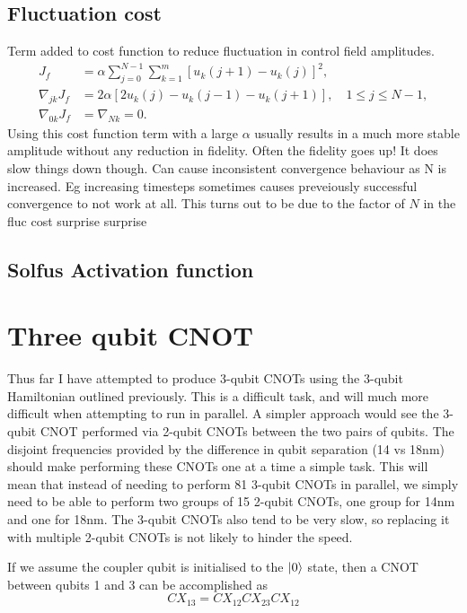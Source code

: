 \documentclass[12pt]{article}
\begin{document}
\subsection{Fluctuation cost}
Term added to cost function to reduce fluctuation in control field amplitudes.
\begin{align}
    J_f &= \alpha\sum_{j=0}^{N-1}\sum_{k=1}^m \left[u_k(j+1)-u_k(j)\right]^2,\\
    \nabla_{jk} J_f&= 2\alpha\left[2u_k(j) - u_k(j-1) - u_k(j+1)\right],\quad 1\leq j\leq N-1,\\
    \nabla_{0k}J_f &= \nabla_{Nk} = 0.
\end{align}
Using this cost function term with a large $\alpha$ usually results in a much more stable amplitude without any reduction in fidelity. Often the fidelity goes up! It does slow things down though. Can cause inconsistent convergence behaviour as N is increased. Eg increasing timesteps sometimes causes preveiously successful convergence to not work at all. This turns out to be due to the factor of $N$ in the fluc cost surprise surprise

\subsection{Solfus Activation function}
    
    
\section{Three qubit CNOT}
Thus far I have attempted to produce 3-qubit CNOTs using the 3-qubit Hamiltonian outlined previously. This is a difficult task, and will much more difficult when attempting to run in parallel. A simpler approach would see the 3-qubit CNOT performed via 2-qubit CNOTs between the two pairs of qubits. The disjoint frequencies provided by the difference in qubit separation (14 vs 18nm) should make performing these CNOTs one at a time a simple task. This will mean that instead of needing to perform 81 3-qubit CNOTs in parallel, we simply need to be able to perform two groups of 15 2-qubit CNOTs, one group for 14nm and one for 18nm. The 3-qubit CNOTs also tend to be very slow, so replacing it with multiple 2-qubit CNOTs is not likely to hinder the speed.

If we assume the coupler qubit is initialised to the $\ket{0}$ state, then a CNOT between qubits 1 and 3 can be accomplished as
\begin{equation}
    CX_{13} = CX_{12}CX_{23}CX_{12}
\end{equation}
    
\end{document}
